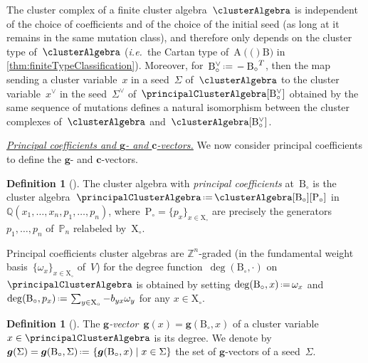 \documentclass{amsart}
\theoremstyle{definition}
\newtheorem{definition}[theorem]{Definition}
\newcommand{\Q}{\mathbb{Q}} %
\newcommand{\Z}{\mathbb{Z}} %
\renewcommand{\b}[1]{{\boldsymbol{#1}}} %
\newcommand{\set}[2]{\left\{ #1 \;\middle|\; #2 \right\}} %
\newcommand{\eqdef}{\mbox{\,\raisebox{0.2ex}{\scriptsize\ensuremath{\mathrm:}}\ensuremath{=}\,}} %
\newcommand{\transpose}[1]{{#1}^T} %
\newcommand{\ie}{\textit{i.e.}~} %
\newcommand{\darkblue}{\color{darkblue}} %
\newcommand{\defn}[1]{\textsl{\darkblue #1}} %
\newcommand{\para}[1]{\medskip\noindent\uline{\textit{#1.}}} %
\newcommand{\gvector}[1]{\b{g}(#1)} %
\newcommand{\gvectorFull}[2]{\b{g}(#1,#2)} %
\newcommand{\gvectors}[1]{\b{g}(#1)} %
\newcommand{\Trop}[1]{\mathbb{P}_{#1}} %
\newcommand{\seed}{\Sigma} %
\newcommand{\cluster}{\mathrm{X}} %
\newcommand{\coefficients}{\mathrm{P}} %
\newcommand{\B}{\mathrm{B}} %
\newcommand{\A}[1]{\mathrm{A}({#1})} %
\newcommand{\fundamentalWeight}{\omega} %
\begin{document}
The cluster complex of a finite cluster algebra~$\clusterAlgebra$ is independent of the choice of coefficients and of the choice of the initial seed (as long at it remains in the same mutation class), and therefore only depends on the cluster type of~$\clusterAlgebra$ (\ie the Cartan type of~$\A(\B)$ in \cref{thm:finiteTypeClassification}).
Moreover, for~$\B_\circ^\vee \eqdef -\transpose{\B_\circ}$, then the map sending a cluster variable~$x$ in a seed~$\seed$ of~$\clusterAlgebra$ to the cluster variable~$x^\vee$ in the seed~$\seed^\vee$ of~$\principalClusterAlgebra[\B_\circ^\vee]$ obtained by the same sequence of mutations defines a natural isomorphism between the cluster complexes of~$\clusterAlgebra$ and~$\clusterAlgebra[\B_\circ^\vee]$.

\para{Principal coefficients and $\b{g}$- and $\b{c}$-vectors}
%
We now consider principal coefficients to define the $\b{g}$- and $\b{c}$-vectors.

\begin{definition}[{\cite[Def.~3.1]{FominZelevinsky-ClusterAlgebrasIV}}]
The cluster algebra with \defn{principal coefficients} at~$\B_\circ$ is the cluster algebra~$\principalClusterAlgebra \eqdef \clusterAlgebra[\B_\circ][\coefficients_\circ]$ in~$\Q(x_1, \dots, x_n, p_1, \dots, p_n)$, where~$\coefficients_\circ = \{p_x\}_{x \in \cluster_\circ}$ are precisely the generators~$p_1, \dots, p_n$ of~$\Trop{n}$ relabeled by~$\cluster_\circ$.
\end{definition}

Principal coefficients cluster algebras are $\Z^n$-graded (in the fundamental weight basis~$\{\omega_x\}_{x \in \cluster_\circ}$ of~$V$) for the degree function~$\deg(\B_\circ,\cdot)$ on $\principalClusterAlgebra$ is obtained by setting
\(
\deg(\B_\circ,  x) \eqdef \fundamentalWeight_x
\)
and
\(
\deg(\B_\circ, p_x) \eqdef \sum_{y \in \cluster_\circ} -b_{yx} \fundamentalWeight_y
\)
for any $x\in\cluster_\circ$.

\begin{definition}[\cite{FominZelevinsky-ClusterAlgebrasIV}]
The \defn{$\b{g}$-vector}~$\gvector{x} = \gvectorFull{\B_\circ}{x}$ of a cluster variable~$x \in \principalClusterAlgebra$ is its degree.
We denote by $\gvectors{\seed} = \gvectorFull{\B_\circ}{\seed} \eqdef \set{\gvectorFull{\B_\circ}{x}}{x \in \seed}$ the set of $\b{g}$-vectors of a seed~$\seed$.
\end{definition}
\end{document}
